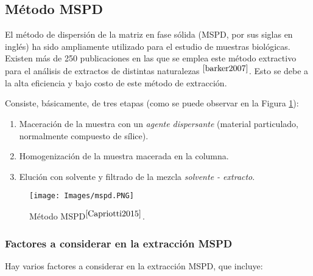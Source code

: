 \subsection{M\'etodo MSPD}	\label{MSPD_chap}

\noindent
\justify

El m\'etodo de dispersi\'on de la matriz en fase s\'olida (MSPD, por sus siglas en ingl\'es) ha sido ampliamente utilizado para el estudio de muestras biol\'ogicas. Existen m\'as de 250 publicaciones en las que se emplea este m\'etodo extractivo para el an\'alisis de extractos de distintas naturalezas $^{\cite{barker2007}}$. Esto se debe a la alta eficiencia y bajo costo de este m\'etodo de extracci\'on. 

\noindent
\justify

Consiste, b\'asicamente, de tres etapas (como se puede observar en la Figura \ref{mspd}):

\begin{enumerate}
	\item Maceraci\'on de la muestra con un \textit{agente dispersante} (material particulado, normalmente compuesto de s\'ilice).
	\item Homogenizaci\'on de la muestra macerada en la columna.
	\item Eluci\'on con solvente y filtrado de la mezcla \textit{solvente - extracto}.
\end{enumerate}

\begin{figure}[h!]
\centering
\texttt{[image: Images/mspd.PNG]}
\caption{M\'etodo MSPD$^{\cite{Capriotti2015}}$.}
\label{mspd}
\end{figure}

\subsubsection{Factores a considerar en la extracci\'on MSPD}

\noindent
\justify

Hay varios factores a considerar en la extracci\'on MSPD, que incluye:

